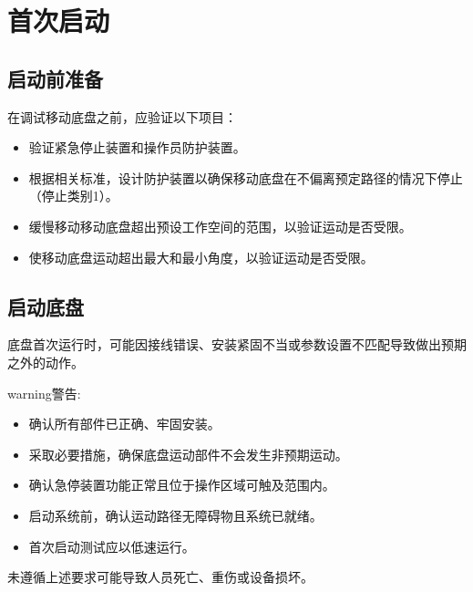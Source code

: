 \documentclass[a4paper,11pt,english,openany,oneside]{sphinxmanual}
\begin{document}
\section{首次启动}
\label{\detokenize{08 _u5b89_u88c5_u4e0e_u8c03_u8bd5:id37}}\label{\detokenize{08 _u5b89_u88c5_u4e0e_u8c03_u8bd5:id38}}

\subsection{启动前准备}
\label{\detokenize{08 _u5b89_u88c5_u4e0e_u8c03_u8bd5:id39}}\label{\detokenize{08 _u5b89_u88c5_u4e0e_u8c03_u8bd5:id40}}
\sphinxAtStartPar
在调试移动底盘之前，应验证以下项目：
\begin{itemize}
\item {} 
\sphinxAtStartPar
验证紧急停止装置和操作员防护装置。

\item {} 
\sphinxAtStartPar
根据相关标准，设计防护装置以确保移动底盘在不偏离预定路径的情况下停止（停止类别1）。

\item {} 
\sphinxAtStartPar
缓慢移动移动底盘超出预设工作空间的范围，以验证运动是否受限。

\item {} 
\sphinxAtStartPar
使移动底盘运动超出最大和最小角度，以验证运动是否受限。

\end{itemize}


\subsection{启动底盘}
\label{\detokenize{08 _u5b89_u88c5_u4e0e_u8c03_u8bd5:id41}}\label{\detokenize{08 _u5b89_u88c5_u4e0e_u8c03_u8bd5:id42}}
\sphinxAtStartPar
底盘首次运行时，可能因接线错误、安装紧固不当或参数设置不匹配导致做出预期之外的动作。

\begin{sphinxadmonition}{warning}{警告:}
\sphinxAtStartPar
{}
\begin{itemize}
\item {} 
\sphinxAtStartPar
确认所有部件已正确、牢固安装。

\item {} 
\sphinxAtStartPar
采取必要措施，确保底盘运动部件不会发生非预期运动。

\item {} 
\sphinxAtStartPar
确认急停装置功能正常且位于操作区域可触及范围内。

\item {} 
\sphinxAtStartPar
启动系统前，确认运动路径无障碍物且系统已就绪。

\item {} 
\sphinxAtStartPar
首次启动测试应以低速运行。

\end{itemize}

\sphinxAtStartPar
未遵循上述要求可能导致人员死亡、重伤或设备损坏。
\end{sphinxadmonition}
\end{document}
